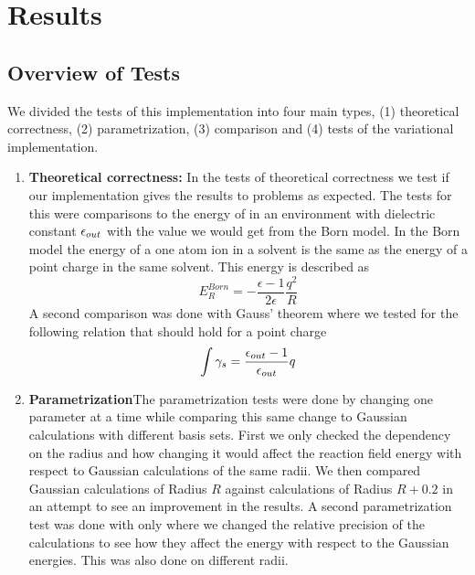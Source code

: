 \documentclass[../master_thesis.tex]{subfiles}
\begin{document}
\chapter{Results}\label{chap:Results}
\section{Overview of Tests}
We divided the tests of this implementation into four main types, (1) theoretical
correctness, (2) parametrization, (3) comparison and (4) tests of the variational implementation.
\begin{enumerate}

\item \textbf{Theoretical correctness:}
In the tests of theoretical correctness we test if our implementation gives the
results to problems as expected. The tests for this were comparisons to
the energy of   in an environment with dielectric constant $\epsilon_{out}$
with the value we would get from the Born model. In the Born model the energy of a  %
one atom ion in a solvent is the same as the energy of a point charge in the same solvent.
This energy is described as \cite{Tomasi:1994wt}
\begin{equation}\label{eq:bornenergy}
  E_{R}^{Born} =-\frac{\epsilon-1}{2 \epsilon} \frac{q^{2}}{R}
\end{equation}
A second comparison was done with Gauss' theorem\cite{Sorland} where we tested for the
following relation that should hold for a point charge
\begin{equation}\label{eq:Reactioncharge}
  \int \gamma_s = \frac{\epsilon_{out} - 1}{\epsilon_{out}} q
\end{equation}

\item \textbf{Parametrization}The parametrization tests were done by changing one parameter at a time while
comparing this same change to Gaussian calculations with different basis sets.
First we only checked the dependency on the radius and how changing it would
affect the reaction field energy with respect to Gaussian calculations of the same
radii. We then compared Gaussian calculations of Radius $R$ against \mrchem
calculations of Radius $R+0.2$ in an attempt to see an improvement in the
results.
A second parametrization test was done with only 
where we changed the relative precision of the \mrchem calculations to see how
they affect the energy with respect to the Gaussian energies. This was also done
on different radii.


\end{enumerate}
\end{document}
